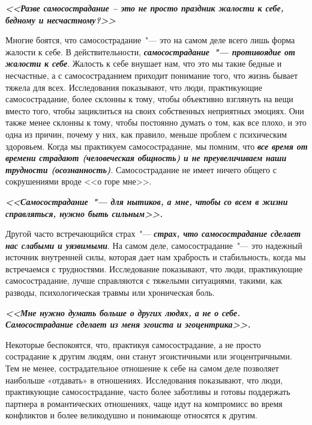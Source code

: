 \vspace{4ex}

\textbf{\textit{<<Разве самосострадание – это не просто праздник жалости к себе, бедному и несчастному?>>}}

\vspace{2ex}

Многие боятся, что самосострадание~"--- это на самом деле всего лишь форма жалости к себе. В действительности,\textbf{\textit{ самосострадание~"--- противоядие от жалости к себе}}. Жалость к себе внушает нам, что это мы такие бедные и несчастные, а с самосостраданием приходит понимание того, что жизнь бывает тяжела для всех. Исследования показывают, что люди, практикующие самосострадание, более склонны к тому, чтобы объективно взглянуть на вещи вместо того, чтобы зациклиться на своих собственных неприятных эмоциях. Они также менее склонны к тому, чтобы постоянно думать о том, как все плохо, и это одна из причин, почему у них, как правило, меньше проблем с психическим здоровьем. Когда мы практикуем самосострадание, мы помним, что \textbf{\textit{все время от времени страдают (человеческая общность) и не преувеличиваем наши трудности (осознанность)}}. Самосострадание не имеет ничего общего с сокрушениями вроде <<о горе мне>>. 

\vspace{4ex}

\textbf{\textit{<<Самосострадание~"--- для нытиков, а мне, чтобы со всем в жизни справляться, нужно быть сильным>>.}}

\vspace{2ex}

Другой часто встречающийся страх~"--- \textbf{\textit{страх, что самосострадание сделает нас слабыми и уязвимыми}}. На самом деле, самосострадание~"--- это надежный источник внутренней силы, которая дает нам храбрость и стабильность, когда мы встречаемся с трудностями. Исследование показывают, что люди, практикующие самосострадание, лучше справляются с тяжелыми ситуациями, такими, как разводы, психологическая травмы или хроническая боль.

\vspace{4ex}

\textbf{\textit{<<Мне нужно думать больше о других людях, а не о себе. Самосострадание сделает из меня эгоиста и эгоцентрика>>.}}

\vspace{2ex}

Некоторые беспокоятся, что, практикуя самосострадание, а не просто сострадание к другим людям, они станут эгоистичными или эгоцентричными. Тем не менее, сострадательное отношение к себе на самом деле позволяет наибольше «отдавать» в отношениях. Исследования показывают, что люди, практикующие самосострадание, часто более заботливы и готовы поддержать партнера в романтических отношениях, чаще идут на компромисс во время конфликтов и более великодушно и понимающе относятся к другим. 

